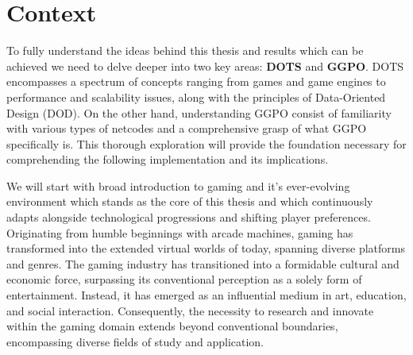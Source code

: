 \chapter{Context}

To fully understand the ideas behind this thesis and results which can be achieved we need to delve deeper into two key areas: \textbf{DOTS} and \textbf{GGPO}. DOTS encompasses a spectrum of concepts ranging from games and game engines to performance and scalability issues, along with the principles of Data-Oriented Design (DOD). On the other hand, understanding GGPO consist of familiarity with various types of netcodes and a comprehensive grasp of what GGPO specifically is. This thorough exploration will provide the foundation necessary for comprehending the following implementation and its implications.\newline

We will start with broad introduction to gaming and it's ever-evolving environment which stands as the core of this thesis and which continuously adapts alongside technological progressions and shifting player preferences. Originating from humble beginnings with arcade machines, gaming has transformed into the extended virtual worlds of today, spanning diverse platforms and genres. The gaming industry has transitioned into a formidable cultural and economic force, surpassing its conventional perception as a solely form of entertainment. Instead, it has emerged as an influential medium in art, education, and social interaction. Consequently, the necessity to research and innovate within the gaming domain extends beyond conventional boundaries, encompassing diverse fields of study and application.\newline

